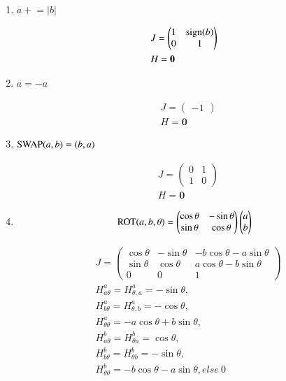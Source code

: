 \documentclass{article}
\newcommand{\<}{\langle}
\renewcommand{\>}{\rangle}
\theoremstyle{definition}\newtheorem{definition}{\textit{Definition}}
\begin{document}
\begin{multicols}{2}
\begin{enumerate}
\item $a \mathrel+= \vert b\vert$

\begin{align*}
    &J = \left(\begin{matrix}
1 &  {\rm sign} (b) \\
0 & 1
\end{matrix}\right)\\
    &H = \mathbf{0}
\end{align*}

\item $a = -a$

\begin{align*}
    &J = \left(\begin{matrix}
-1
\end{matrix}\right)\\
    &H = \mathbf{0}
\end{align*}

\item ${\rm SWAP}(a, b) = (b, a)$

\begin{align*}
    &J = \left(\begin{matrix}
0 & 1 \\
1 & 0
\end{matrix}\right)\\
    &H = \mathbf{0}
\end{align*}

\item \begin{align*}
{\rm ROT}(a, b, \theta)  = \left(\begin{matrix}
        \cos\theta & - \sin\theta\\
        \sin\theta  & \cos\theta
    \end{matrix}\right)
    \left(\begin{matrix}
        a\\
        b
    \end{matrix}\right)
\end{align*}

\begin{align*}
    &J = \left(\begin{matrix}
        \cos\theta & - \sin\theta & -b\cos\theta-a\sin \theta\\
        \sin\theta  & \cos\theta & a\cos\theta -b\sin\theta\\
        0 & 0 & 1
    \end{matrix}\right)\\
    &H^a_{a\theta} = H^a_{\theta, a} = -\sin\theta,\\
    &H^a_{b\theta} = H^a_{\theta, b} = -\cos\theta,\\
    &H^a_{\theta\theta} = -a\cos\theta + b\sin\theta,\\
    &H^b_{a\theta} = H^b_{\theta a} = \cos\theta,\\
    &H^b_{b\theta} = H^b_{\theta b} = -\sin\theta,\\
    &H^b_{\theta\theta} = -b\cos\theta-a\sin\theta, else ~0
\end{align*}
\end{enumerate}
\end{multicols}
\end{document}
